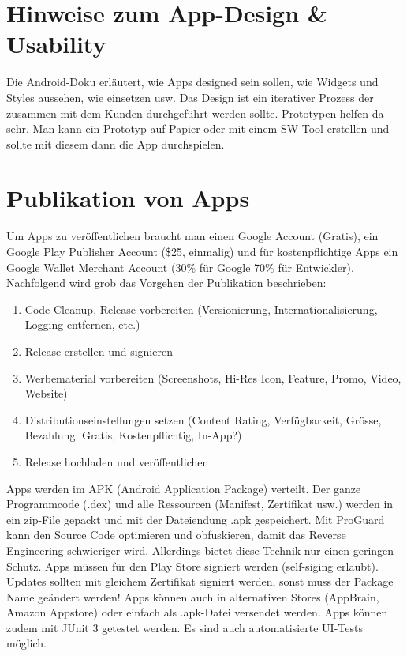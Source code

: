 \section{Hinweise zum App-Design \& Usability}

Die Android-Doku erläutert, wie Apps designed sein sollen, wie Widgets und Styles aussehen, wie einsetzen usw. Das Design ist ein iterativer Prozess der zusammen mit dem Kunden durchgeführt werden sollte. Prototypen helfen da sehr. Man kann ein Prototyp auf Papier oder mit einem SW-Tool erstellen und sollte mit diesem dann die App durchspielen. 

\section{Publikation von Apps}

Um Apps zu veröffentlichen braucht man einen Google Account (Gratis), ein Google Play Publisher Account (\$25, einmalig) und für kostenpflichtige Apps ein Google Wallet Merchant Account (30\% für Google 70\% für Entwickler). Nachfolgend wird grob das Vorgehen der Publikation beschrieben:
\begin{enumerate}
	\item Code Cleanup, Release vorbereiten (Versionierung, Internationalisierung, Logging entfernen, etc.)
	\item Release erstellen und signieren
	\item Werbematerial vorbereiten (Screenshots, Hi-Res Icon, Feature, Promo, Video, Website)
	\item Distributionseinstellungen setzen (Content Rating, Verfügbarkeit, Grösse, Bezahlung: Gratis, Kostenpflichtig, In-App?)
	\item Release hochladen und veröffentlichen
\end{enumerate}
Apps werden im APK (Android Application Package) verteilt. Der ganze Programmcode (.dex) und alle Ressourcen (Manifest, Zertifikat usw.) werden in ein zip-File gepackt und mit der Dateiendung .apk gespeichert.
Mit ProGuard kann den Source Code optimieren und obfuskieren, damit das Reverse Engineering schwieriger wird. Allerdings bietet diese Technik nur einen geringen Schutz.
Apps müssen für den Play Store signiert werden (self-siging erlaubt). Updates sollten mit gleichem Zertifikat signiert werden, sonst muss der Package Name geändert werden!
Apps können auch in alternativen Stores (AppBrain, Amazon Appstore) oder einfach als .apk-Datei versendet werden. Apps können zudem mit JUnit 3 getestet werden. Es sind auch automatisierte UI-Tests möglich.
